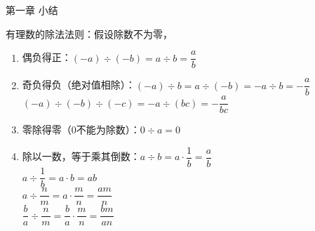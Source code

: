 \documentclass[aspectratio=169]{ctexbeamer} %
\begin{document}
\begin{frame}[t]{第一章 小结}
\begin{spacing}{1.2}
\normalsize
有理数的除法法则：假设除数不为零，
\begin{enumerate}[label={\arabic*.}]
\item 偶负得正：$(-a) ÷  (-b)  = a  ÷  b = \dfrac{a}{b}$ 
\item 奇负得负（绝对值相除）：$(-a)÷b  = a÷(-b) = -a÷b = -\dfrac{a}{b}$ \\
\vspace{0.5cm}
$(-a)÷(-b)÷(-c)  =-a÷(bc) = -\dfrac{a}{bc}$
\item 零除得零（0不能为除数）：$0 ÷  a = 0$
\item 除以一数，等于乘其倒数：$a ÷ b = a  \cdot \dfrac{1}{b} = \dfrac{a}{b}$  \\
\vspace{0.5cm}
$a ÷ \dfrac{1}{b} = a  \cdot b = ab$ \\
\vspace{0.5cm}
$a ÷ \dfrac{n}{m} = a  \cdot \dfrac{m}{n} = \dfrac{am}{n}$ \\
\vspace{0.5cm}
$\dfrac{b}{a} ÷ \dfrac{n}{m} = \dfrac{b}{a}  \cdot \dfrac{m}{n} = \dfrac{bm}{an}$
\end{enumerate}

\end{spacing}
\end{frame}
\end{document}
